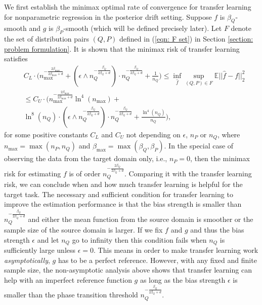 \documentclass{article}
\def\E{\mathbb{E}}
\def\bmax{\beta_{\max}}
\begin{document}
We first establish the minimax optimal rate of convergence for transfer learning for nonparametric regression in the  posterior drift setting. Suppose $f$ is $\beta_Q$-smooth and $g$ is $\beta_P$-smooth (which will be defined precisely later). Let $F$ denote the set of distribution pairs $(Q, P)$ defined in (\ref{eqn: F set}) in Section \ref{section: problem formulation}. It is shown that the minimax risk of transfer learning satisfies 
 \begin{align*}
&C_L\cdot\bigg(n_{\max}^{-\frac{2\bmax}{2\bmax+d}}+ (\epsilon \wedge n_Q^{-\frac{\beta_Q}{2\beta_Q+d}})\cdot n_Q^{-\frac{\beta_Q}{2\beta_Q+d}}+\frac{1}{n_Q}\bigg)\leq \inf_{\hat f}\sup_{(Q, P)\in F}\E ||\hat f-f||_2^2\\
&\leq C_U\cdot\bigg( n_{\max}^{-\frac{2\bmax}{2\bmax+d}}\ln^4(n_{\max})+ \\
&\ln^8(n_Q)\cdot(\epsilon \wedge n_Q^{-\frac{\beta_Q}{2\beta_Q+d}})\cdot n_Q^{-\frac{\beta_Q}{2\beta_Q+d}}+\frac{\ln^4(n_Q)}{n_Q}\bigg),\end{align*}
for some positive constants $C_L$ and $C_U$ not depending on $\epsilon$, $n_P$ or $n_Q$, where $n_{\max}=\max( n_{P},n_Q)$ and $\beta_{\max}=\max(\beta_Q,\beta_P)$. In the special case of observing the data from the target domain only, i.e., $n_P=0$,  then the minimax risk for estimating $f$ is of order $n_Q^{-\frac{2\beta_Q}{2\beta_Q+d}}$. Comparing it with the transfer learning risk, we can conclude when and how much transfer learning is helpful for the target task. The necessary  and sufficient condition for transfer learning to improve the estimation performance is  that the bias strength is smaller than $n_Q^{-\frac{\beta_Q}{2\beta_Q+d}}$ and either the mean function from the source domain is smoother or the sample size of the source domain is larger. If we fix $f$ and $g$ and thus the bias strength $\epsilon$ and let $n_Q$ go to infinity then this condition fails when $n_Q$ is sufficiently large unless $\epsilon=0$. This means in order to make transfer learning work \emph{asymptotically}, $g$ has to be a perfect reference. However, with any fixed and finite sample size, the non-asymptotic analysis above shows that transfer learning can help with an imperfect reference function $g$ as long as the bias strength $\epsilon$ is smaller than the phase transition threshold $n_Q^{-\frac{\beta_Q}{2\beta_Q+d}}$. 
\end{document}
